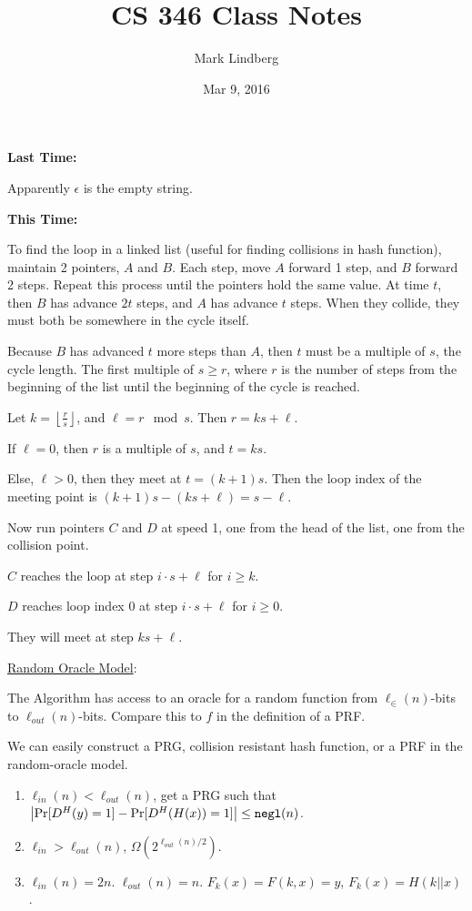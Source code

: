\documentclass[12pt]{article}
\newcommand{\negl}{{\tt negl}}
\begin{document}
\title{CS 346 Class Notes}
\date{Mar 9, 2016}
\author{Mark Lindberg}
\maketitle
\thispagestyle{fancy}

{\bf Last Time:}

Apparently $\epsilon$ is the empty string.

{\bf This Time:}

To find the loop in a linked list (useful for finding collisions in hash function), maintain 2 pointers, $A$ and $B$. Each step, move $A$ forward 1 step, and $B$ forward 2 steps. Repeat this process until the pointers hold the same value. At time $t$, then $B$ has advance $2t$ steps, and $A$ has advance $t$ steps. When they collide, they must both be somewhere in the cycle itself.

Because $B$ has advanced $t$ more steps than $A$, then $t$ must be a multiple of $s$, the cycle length. The first multiple of $s\geq r$, where $r$ is the number of steps from the beginning of the list until the beginning of the cycle is reached.

Let $k=\left\lfloor\frac{r}{s}\right\rfloor$, and $\ell=r\mod{s}$. Then $r=ks+\ell$.

If $\ell=0$, then $r$ is a multiple of $s$, and $t=ks$.

Else, $\ell>0$, then they meet at $t=(k+1)s$. Then the loop index of the meeting point is $(k+1)s-(ks+\ell)=s-\ell$.

Now run pointers $C$ and $D$ at speed 1, one from the head of the list, one from the collision point.

$C$ reaches the loop at step $i\cdot s+\ell$ for $i\geq k$.

$D$ reaches loop index $0$ at step $i\cdot s+\ell$ for $i\geq 0$.

They will meet at step $ks+\ell$.

\underline{Random Oracle Model}:

The Algorithm has access to an oracle for a random function from $\ell_{\in}(n)$-bits to $\ell_{out}(n)$-bits. Compare this to $f$ in the definition of a PRF.

We can easily construct a PRG, collision resistant hash function, or a PRF in the random-oracle model.\begin{enumerate}

\item $\ell_{in}(n)<\ell_{out}(n)$, get a PRG such that $\left|\Pr[D^H(y)=1]-\Pr[D^H(H(x))=1]\right|\leq\negl(n)$.

\item $\ell_{in}>\ell_{out}(n)$, $\Omega\left(2^{\ell_{out}(n)/2}\right)$.

\item $\ell_{in}(n)=2n$. $\ell_{out}(n)=n$. $F_k(x)=F(k,x)=y$, $F_k(x)=H(k||x)$.

\end{enumerate}
\end{document}
